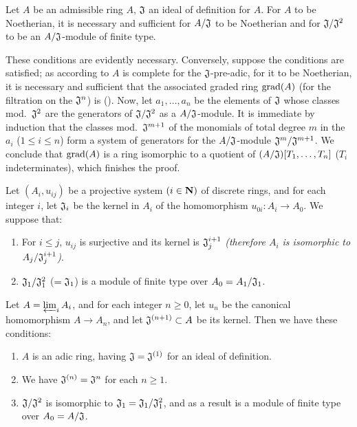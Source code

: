 \begin{cor}[7.2.6]
\label{0.7.2.6}
Let $A$ be an admissible ring $A$, $\mathfrak{J}$ an ideal of definition for $A$.
For $A$ to be Noetherian, it is necessary and sufficient for $A/\mathfrak{J}$ to be Noetherian and for $\mathfrak{J}/\mathfrak{J}^2$ to be an $A/\mathfrak{J}$-module of finite type.
\end{cor}

These conditions are evidently necessary. Conversely, suppose the conditions
are satisfied; as according to  $A$ is complete for the
$\mathfrak{J}$-pre-adic, for it to be Noetherian, it is necessary and sufficient
that the associated graded ring ${\mathop{\mathrm{grad}}\nolimits}(A)$ (for the filtration on the
$\mathfrak{J}^n$) is (\cite[p~.18--07, th.~4]{I-1}). Now, let $a_1,\dots,a_n$ be
the elements of $\mathfrak{J}$ whose classes mod.~$\mathfrak{J}^2$ are the
generators of $\mathfrak{J}/\mathfrak{J}^2$ as a $A/\mathfrak{J}$-module. It
is immediate by induction that the classes mod.~$\mathfrak{J}^{m+1}$ of the
monomials of total degree $m$ in the $a_i$ ($1\leqslant i\leqslant n$) form a
system of generators for the $A/\mathfrak{J}$-module
$\mathfrak{J}^m/\mathfrak{J}^{m+1}$. We conclude that ${\mathop{\mathrm{grad}}\nolimits}(A)$ is a ring
isomorphic to a quotient of $(A/\mathfrak{J})[T_1,\dots,T_n]$ ($T_i$
indeterminates), which finishes the proof.

\begin{prop}[7.2.7]
\label{0.7.2.7}
Let $(A_i,u_{ij})$ be a projective system $(i\in\mathbf{N})$ of discrete rings, and
for each integer $i$, let $\mathfrak{J}_i$ be the kernel in $A_i$ of the
homomorphism $u_{0i}:A_i\to A_0$. We suppose that:
\begin{enumerate}[label=\emph{(\alph*)}]
  \item For $i\leqslant j$, $u_{ij}$ is surjective and its kernel is $\mathfrak{J}_j^{i+1}$
    \emph{(therefore $A_i$ is isomorphic to $A_j/\mathfrak{J}_j^{i+1}$)}.
  \item $\mathfrak{J}_1/\mathfrak{J}_1^2$ ($=\mathfrak{J}_1$) is a module of
    finite type over $A_0=A_1/\mathfrak{J}_1$.
\end{enumerate}
Let $A=\varprojlim_i A_i$, and for each integer $n\geqslant 0$, let $u_n$ be the
canonical homomorphism $A\to A_n$, and let $\mathfrak{J}^{(n+1)}\subset A$ be
its kernel. Then we have these conditions:
\begin{enumerate}[label=\emph{(\roman*)}]
  \item $A$ is an adic ring, having $\mathfrak{J}=\mathfrak{J}^{(1)}$ for an
    ideal of definition.
  \item We have $\mathfrak{J}^{(n)}=\mathfrak{J}^n$ for each $n\geqslant 1$.
  \item $\mathfrak{J}/\mathfrak{J}^2$ is isomorphic to
    $\mathfrak{J}_1=\mathfrak{J}_1/\mathfrak{J}_1^2$, and as a result is a module of finite type
    over $A_0=A/\mathfrak{J}$.
\end{enumerate}
\end{prop}

